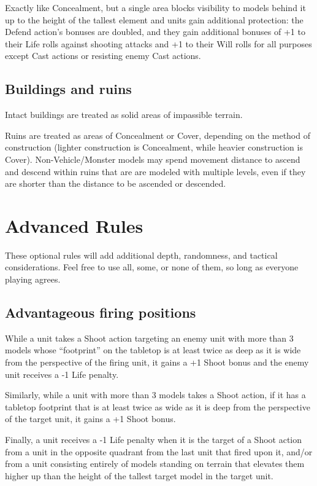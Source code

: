 \begin{multicols}{2}
Exactly like Concealment, but a single area blocks visibility to models behind it up to the height of the tallest element and units gain additional protection: the Defend action's bonuses are doubled, and they gain additional bonuses of +1 to their Life rolls against shooting attacks and +1 to their Will rolls for all purposes except Cast actions or resisting enemy Cast actions.


\section*{Buildings and ruins}
Intact buildings are treated as solid areas of impassible terrain.

Ruins are treated as areas of Concealment or Cover, depending on the method of construction (lighter construction is Concealment, while heavier construction is Cover). Non-Vehicle/Monster models may spend movement distance to ascend and descend within ruins that are are modeled with multiple levels, even if they are shorter than the distance to be ascended or descended.





\chapter*{Advanced Rules}
These optional rules will add additional depth, randomness, and tactical considerations. Feel free to use all, some, or none of them, so long as everyone playing agrees.




\section*{Advantageous firing positions}
While a unit takes a Shoot action targeting an enemy unit with more than 3 models whose ``footprint'' on the tabletop is at least twice as deep as it is wide from the perspective of the firing unit, it gains a +1 Shoot bonus and the enemy unit receives a -1 Life penalty.

Similarly, while a unit with more than 3 models takes a Shoot action, if it has a tabletop footprint that is at least twice as wide as it is deep from the perspective of the target unit, it gains a +1 Shoot bonus.

Finally, a unit receives a -1 Life penalty when it is the target of a Shoot action from a unit in the opposite quadrant from the last unit that fired upon it, and/or from a unit consisting entirely of models standing on terrain that elevates them higher up than the height of the tallest target model in the target unit.


\end{multicols}
